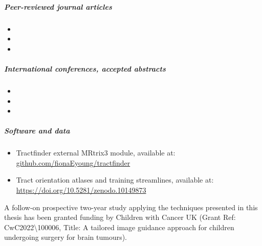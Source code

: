 \subparagraph*{Peer-reviewed journal articles}
\begin{itemize}
  \item[] 
  \item[] 
  \item[] 
\end{itemize}

\subparagraph*{International conferences, accepted abstracts}
\begin{itemize}
  \item[] 
  \item[] 
  \item[] 
\end{itemize}

\subparagraph*{Software and data}
\begin{itemize}
  \item[] Tractfinder external MRtrix3 module, available at: \url{github.com/fionaEyoung/tractfinder}
  \item[] Tract orientation atlases and training streamlines, available at: \url{https://doi.org/10.5281/zenodo.10149873}
\end{itemize}

\noindent A follow-on prospective two-year study applying the techniques presented in this thesis has been granted funding by Children with Cancer UK (Grant Ref: CwC2022\textbackslash100006, Title:  A tailored image guidance approach for children undergoing surgery for brain tumours).
